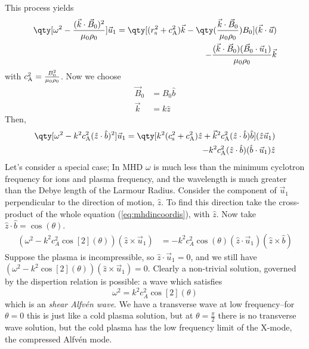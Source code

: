 \documentclass{book}         		                %
\begin{document}
This process yields
\begin{equation}
  \label{eq:mhdequation}
\begin{split}
  \qty[ \omega^2 - \frac{(\vec{k} \cdot \vec{B}_0 )^2}{\mu_0 \rho_0}] \vec{u}_1 = \qty[(r_{\rm s}^2 + c_{\rm A}^2) \vec{k} - \qty( \frac{\vec{k} \cdot \vec{B}_0}{\mu_0 \rho_0} ) B_0] (\vec{k} \cdot \vec{u}) \\- \frac{(\vec{k}\cdot \vec{B}_0)(\vec{B}_0 \cdot \vec{u}_1)}{\mu_0 \rho_0} \vec{k}
\end{split}
\end{equation}
with $c_{\rm A}^2 = \frac{B_0^2}{\mu_0 \rho_0}$.
Now we choose 
\begin{subequations}
  \begin{align}
    \vec{B}_0 &= B_0 \hat{b} \\ \vec{k} &= k \hat{z}
  \end{align}
\end{subequations}
Then,
\begin{equation}
  \label{eq:mhdincoordis}
\begin{split}
  \qty[ \omega^2 - k^2 c_{\rm A}^2 (\hat{z} \cdot \hat{b})^2 ] \vec{u}_1 = \qty[ k^2 (c_{\rm s}^2 + c_{\rm A}^2) \hat{z} + \vec{k}^2 c_{\rm A}^2 (\hat{z} \cdot \hat{b} ) \hat{b} ](\hat{z} \vec{u}_1) \\ - k^2 c_{\rm A}^2 (\hat{z} \cdot \hat{b}) (\hat{b} \cdot \vec{u}_1) \hat{z}
\end{split}
\end{equation}
Let's consider a special case; In MHD $\omega$ is much less than the
minimum cyclotron frequency for ions and plasma frequency, and the
wavelength is much greater than the Debye length of the Larmour
Radius. Consider the component of $\vec{u}_1$ perpendicular to the
direction of motion, $\hat{z}$. To find this direction take the cross-product of the whole equation (\ref{eq:mhdincoordis}), with $\hat{z}$. Now take $\hat{z} \cdot \hat{b} = \cos(\theta)$.
\begin{align*}
  (\omega^2 - k^2 c_A^2 \cos[2](\theta))(\hat{z} \times \vec{u}_1) &= -k^2 c_A^2 \cos(\theta) (\hat{z} \cdot \vec{u}_1)(\hat{z} \times \hat{b})
\end{align*}
Suppose the plasma is incompressible, so $\hat{z} \cdot \vec{u}_1 = 0$, and we still have $(\omega^2 - k^2 \cos[2](\theta))(\hat{z} \times \vec{u}_1) = 0$. Clearly a non-trivial solution, governed by the dispertion relation is possible: a wave which satisfies
\begin{equation}
  \label{eq:shearalfven}
  \omega^2 = k^2 c_A^2 \cos[2](\theta) 
\end{equation}
which is an \emph{shear Alfv\'{e}n wave}.  We have a transverse wave
at low frequency--for $\theta=0$ this is just like a cold plasma
solution, but at $\theta=\frac{\pi}{2}$ there is no transverse wave
solution, but the cold plasma has the low frequency limit of the X-mode, the compressed Alfv\'en mode. 
\end{document}
